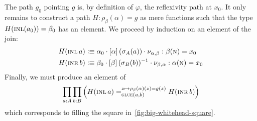 \documentclass[english,a4paper]{lmcs}
\begin{document}
The path $g_0$ pointing $g$ is, by definition of $\varphi$,
the reflexivity path at $x_0$.
It only remains to construct a path $H : \rho_\beta(\alpha) = g$ as
mere functions such that the type $H(\mathop{\textsc{inl}}(a_0)) = \beta_0$ has an
element. We proceed by induction on an element of the join:
\begin{align*}
  H(\mathop{\textsc{inl}} a) &\vcentcolon\equiv \alpha_0 \cdot \left[{\alpha}\right](\sigma_A(a))
              \cdot \nu_{\alpha,\beta} : \beta(\textsc{n}) = x_0 \\
  H(\mathop{\textsc{inr}} b) &\vcentcolon\equiv \beta_0 \cdot \left[{\beta}\right](\sigma_B(b))^{-1}
              \cdot \nu_{\beta,\alpha} : \alpha(\textsc{n}) = x_0
\end{align*}
Finally, we must produce an element of
\begin{equation}\label{eq:big-whitehead-pathover}
  \prod_{a: A}\prod_{b: B} \left(
    H(\mathop{\textsc{inl}} a) =^{z\mapsto \rho_\beta(\alpha)(z)=g(z)}_{\operatorname{\textsc{glue}}(a,b)} H(\mathop{\textsc{inr}} b)
  \right)
\end{equation}
which corresponds to filling the square in~\cref{fig:big-whitehead-square}.
\end{document}
